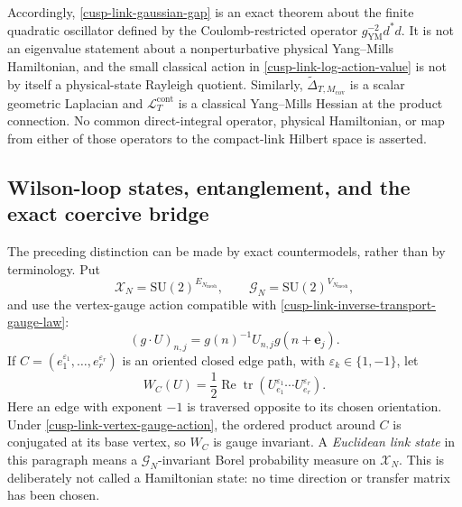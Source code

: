 \documentclass[11pt]{article}
\theoremstyle{definition}
\numberwithin{equation}{section}
\begin{document}
Accordingly, \eqref{cusp-link-gaussian-gap} is an exact theorem about the
finite quadratic oscillator defined by the Coulomb-restricted operator
\(g_{\mathrm{YM}}^{-2}d^*d\).  It is not an eigenvalue statement about a
nonperturbative physical Yang--Mills
Hamiltonian, and the small classical action in
\eqref{cusp-link-log-action-value} is not by itself a physical-state Rayleigh
quotient.  Similarly, \(\widetilde\Delta_{T,M_{\mathrm{cov}}}\) is a scalar
geometric Laplacian and \(\mathcal L_T^{\mathrm{cont}}\) is a classical
Yang--Mills Hessian at the product connection.  No common direct-integral
operator, physical Hamiltonian, or map from either of those operators to the
 compact-link Hilbert space is asserted.

\subsection{Wilson-loop states, entanglement, and the exact coercive bridge}
\label{cusp-link-spectral-logic}

The preceding distinction can be made by exact countermodels, rather than by
terminology.  Put
\[
 \mathscr X_N=\mathrm{SU}(2)^{E_{N_{\mathrm{mesh}}}},
 \qquad
 \mathscr G_N=\mathrm{SU}(2)^{V_{N_{\mathrm{mesh}}}},
\]
and use the vertex-gauge action compatible with
\eqref{cusp-link-inverse-transport-gauge-law}:
\begin{equation}
 (g\cdot U)_{n,j}
 =g(n)^{-1}U_{n,j}g(n+\mathbf e_j).
 \label{cusp-link-vertex-gauge-action}
\end{equation}
If \(C=(e_1^{\varepsilon_1},\ldots,e_r^{\varepsilon_r})\) is an oriented
closed edge path, with \(\varepsilon_k\in\{1,-1\}\), let
\begin{equation}
 W_C(U)=\frac12\operatorname{Re}\operatorname{tr}
 \left(U_{e_1}^{\varepsilon_1}\cdots U_{e_r}^{\varepsilon_r}\right).
 \label{cusp-link-wilson-loop-observable}
\end{equation}
Here an edge with exponent \(-1\) is traversed opposite to its chosen
orientation.  Under \eqref{cusp-link-vertex-gauge-action}, the ordered product
around \(C\) is conjugated at its base vertex, so \(W_C\) is gauge invariant.
A \emph{Euclidean link state} in this paragraph means a
\(\mathscr G_N\)-invariant Borel probability measure on \(\mathscr X_N\).
This is deliberately not called a Hamiltonian state: no time direction or
transfer matrix has been chosen.
\end{document}
